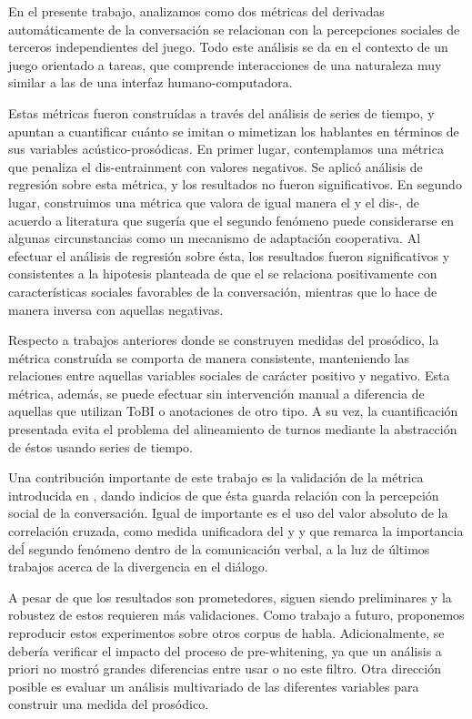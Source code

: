 En el presente trabajo, analizamos como dos métricas del \entrainment derivadas automáticamente de la conversación se relacionan con la percepciones sociales de terceros independientes del juego. Todo este análisis se da en el contexto de un juego orientado a tareas, que comprende interacciones de una naturaleza muy similar a las de una interfaz humano-computadora.

Estas métricas fueron construídas a través del análisis de series de tiempo, y apuntan a cuantificar cuánto se imitan o mimetizan los hablantes en términos de sus variables acústico-prosódicas. En primer lugar, contemplamos una métrica que penaliza el dis-entrainment con valores negativos. Se aplicó análisis de regresión sobre esta métrica, y los resultados no fueron significativos. En segundo lugar, construimos una métrica que valora de igual manera el \entrainment y el dis-\entrainment, de acuerdo a literatura que sugería que el segundo fenómeno puede considerarse en algunas circunstancias como un mecanismo de adaptación cooperativa. Al efectuar el análisis de regresión sobre ésta, los resultados fueron significativos y consistentes a la hipotesis planteada de que el \entrainment se relaciona positivamente con características sociales favorables de la conversación, mientras que lo hace de manera inversa con aquellas negativas.

Respecto a trabajos anteriores donde se construyen medidas del \entrainment prosódico, la métrica construída se comporta de manera consistente, manteniendo las relaciones entre aquellas variables sociales de carácter positivo y negativo. Esta métrica, además, se puede efectuar sin intervención manual a diferencia de aquellas que utilizan ToBI o anotaciones de otro tipo. A su vez, la cuantificación presentada evita el problema del alineamiento de turnos mediante la abstracción de éstos usando series de tiempo.

Una contribución importante de este trabajo es la validación de la métrica introducida en \cite{KOU2008.2}, dando indicios de que ésta guarda relación con la percepción social de la conversación. Igual de importante es el uso del valor absoluto de la correlación cruzada, como medida unificadora del \entrainment y \disentrainment y que remarca la importancia deĺ segundo fenómeno dentro de la comunicación verbal, a la luz de últimos trabajos acerca de la divergencia en el diálogo.

A pesar de que los resultados son prometedores, siguen siendo preliminares y la robustez de estos requieren más validaciones. Como trabajo a futuro, proponemos reproducir estos experimentos sobre otros corpus de habla. Adicionalmente, se debería verificar el impacto del proceso de pre-whitening, ya que un análisis a priori no mostró grandes diferencias entre usar o no este filtro. Otra dirección posible es evaluar un análisis multivariado de las diferentes variables \ap para construir una medida del \entrainment prosódico.
